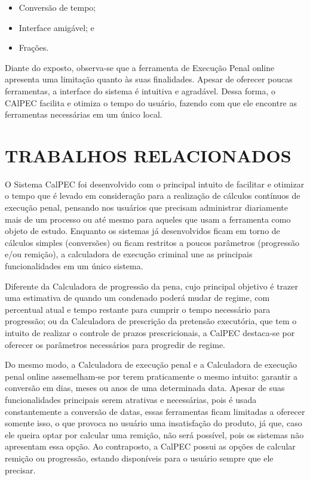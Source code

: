 \begin{itemize}
    \item Conversão de tempo; 
    \item Interface amigável; e
    \item Frações.
\end{itemize}

Diante do exposto, observa-se que a ferramenta de Execução Penal online apresenta uma limitação quanto às suas finalidades. Apesar de oferecer poucas ferramentas, a interface do sistema é intuitiva e agradável. Dessa forma, o CAlPEC facilita e otimiza o tempo do usuário, fazendo com que ele encontre as ferramentas necessárias em um único local.

\section{TRABALHOS RELACIONADOS}

O Sistema CalPEC foi desenvolvido com o principal intuito de facilitar e otimizar o tempo que é levado em consideração para a realização de cálculos contínuos de execução penal, pensando nos usuários que precisam administrar diariamente mais de um processo ou até mesmo para aqueles que usam a ferramenta como objeto de estudo. Enquanto os sistemas já desenvolvidos ficam em torno de cálculos simples (conversões) ou ficam restritos a poucos parâmetros (progressão e/ou remição), a calculadora de execução criminal une as principais funcionalidades em um único sistema.

Diferente da Calculadora de progressão da pena, cujo principal objetivo é trazer uma estimativa de quando um condenado poderá mudar de regime, com percentual atual e tempo restante para cumprir o tempo necessário para progressão; ou da Calculadora de prescrição da pretensão executória, que tem o intuito de realizar o controle de prazos prescricionais, a CalPEC destaca-se por oferecer os parâmetros necessários para progredir de regime. \cite{cnjCalculadora, buscacdp}

Do mesmo modo, a Calculadora de execução penal e a Calculadora de execução penal online assemelham-se por terem praticamente o mesmo intuito: garantir a conversão em dias, meses ou anos de uma determinada data. Apesar de suas funcionalidades principais serem atrativas e necessárias, pois é usada constantemente a conversão de datas, essas ferramentas ficam limitadas a oferecer somente isso, o que provoca no usuário uma insatisfação do produto, já que, caso ele queira optar por calcular uma remição, não será possível, pois os sistemas não apresentam essa opção. Ao contraposto, a CalPEC possui as opções de calcular remição ou progressão, estando disponíveis para o usuário sempre que ele precisar. \cite{fernandoCruzCalc, saraBarbozaCalc}

